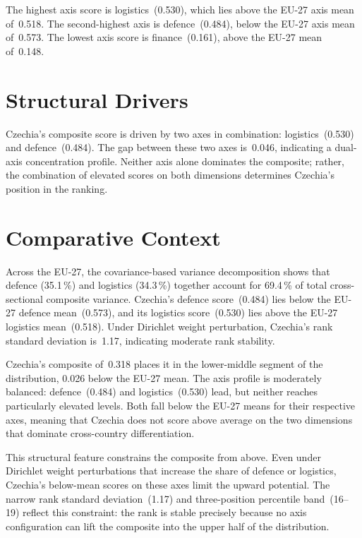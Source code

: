 \documentclass[12pt,a4paper]{article}
\begin{document}
The highest axis score is logistics~(0.530), which lies above the EU-27 axis mean of~0.518.  The second-highest axis is defence~(0.484), below the EU-27 axis mean of~0.573.  The lowest axis score is finance~(0.161), above the EU-27 mean of~0.148.


\section{Structural Drivers}
\label{sec:drivers}

\begin{sloppypar}
Czechia's composite score is driven by two axes in combination: logistics~(0.530) and defence~(0.484).  The gap between these two axes is~0.046, indicating a dual-axis concentration profile.  Neither axis alone dominates the composite; rather, the combination of elevated scores on both dimensions determines Czechia's position in the ranking.
\end{sloppypar}


\section{Comparative Context}
\label{sec:comparative}

Across the EU-27, the covariance-based variance decomposition shows that defence (35.1\,\%) and logistics (34.3\,\%) together account for 69.4\,\% of total cross-sectional composite variance.  Czechia's defence score~(0.484) lies below the EU-27 defence mean~(0.573), and its logistics score~(0.530) lies above the EU-27 logistics mean~(0.518).  Under Dirichlet weight perturbation, Czechia's rank standard deviation is~1.17, indicating moderate rank stability.



Czechia's composite of~0.318 places it in the lower-middle segment of the distribution, 0.026 below the EU-27 mean.  The axis profile is moderately balanced: defence~(0.484) and logistics~(0.530) lead, but neither reaches particularly elevated levels.  Both fall below the EU-27 means for their respective axes, meaning that Czechia does not score above average on the two dimensions that dominate cross-country differentiation.

This structural feature constrains the composite from above.  Even under Dirichlet weight perturbations that increase the share of defence or logistics, Czechia's below-mean scores on these axes limit the upward potential.  The narrow rank standard deviation~(1.17) and three-position percentile band~(16--19) reflect this constraint: the rank is stable precisely because no axis configuration can lift the composite into the upper half of the distribution.
\end{document}
